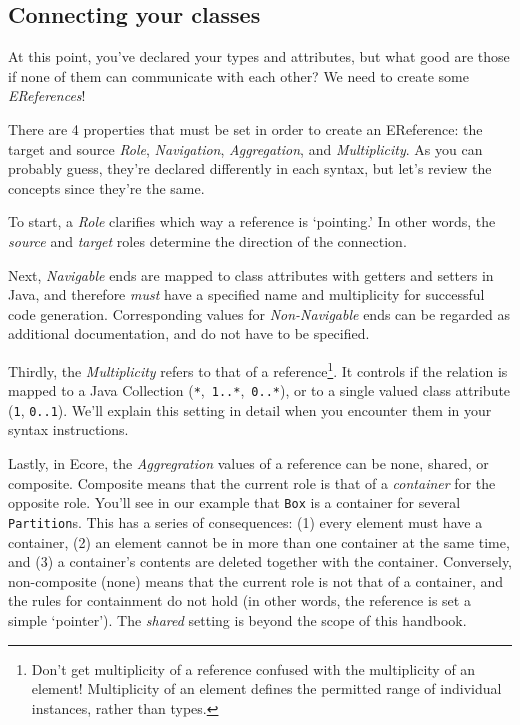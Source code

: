 \newpage
\subsection{Connecting your classes}
\genHeader
\hypertarget{static:references splash}{}

\texttt{}
\emph{}

At this point, you've declared your types and attributes, but what good are those if none of them can communicate with each other? We need to create some
\emph{EReferences}!

There are 4 properties that must be set in order to create an EReference: the target and source \emph{Role}, \emph{Navigation}, \emph{Aggregation}, and
\emph{Multiplicity}. As you can probably guess, they're declared differently in each syntax, but let's review the concepts since they're the same.

To start, a \emph{Role} clarifies which way a reference is `pointing.' In other words, the \emph{source} and \emph{target} roles determine the direction of the
connection.

Next, \emph{Navigable} ends are mapped to class attributes with getters and setters in Java, and therefore \emph{must} have a specified name and
multiplicity for successful code generation. Corresponding values for \emph{Non-Navigable} ends can  be regarded as additional documentation, and do not have
to be specified.

Thirdly, the \emph{Multiplicity} refers to that of a reference\footnote{Don't get multiplicity of a reference confused with the multiplicity of an element!
Multiplicity of an element defines the permitted range of individual instances, rather than types.}. It controls if the relation is mapped to a
Java Collection (\texttt{*},~\texttt{1..*},~\texttt{0..*}), or to a single valued class attribute (\texttt{1}, \texttt{0..1}). We'll explain this setting in
detail when you encounter them in your syntax instructions.

Lastly, in Ecore, the \emph{Aggregration} values of a reference can be none, shared, or com\-po\-site. Composite means that the current role is that of a
\emph{container} for the opposite role. You'll see in our example that \texttt{Box} is a container for several \texttt{Partition}s.
This has a series of consequences: (1) every element must have a container, (2) an element cannot be in more than one container at the same time, and (3) a
container's contents are deleted together with the container. Conversely, non-composite (none) means that the current role is not that of a container,
and the rules for containment do not hold (in other words, the reference is set a simple `pointer'). The \emph{shared} setting is beyond the scope of this
handbook.





